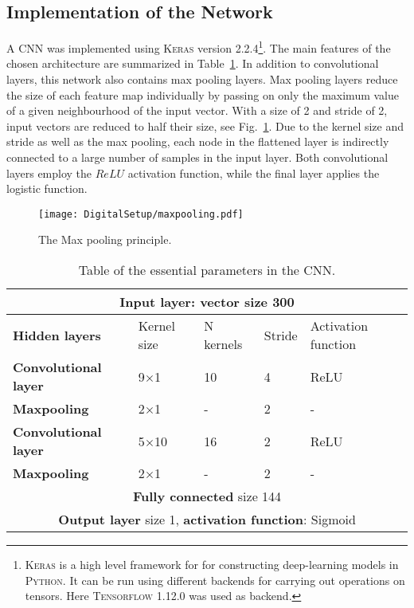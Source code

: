 \documentclass[main.tex]{subfiles}
\begin{document}
\subsection{Implementation of the Network}
A CNN was implemented using \textsc{Keras} version 2.2.4\footnote{\textsc{Keras} is a high level framework for for constructing deep-learning models in \textsc{Python}. It can be run using different backends for carrying out operations on tensors. Here \textsc{Tensorflow} 1.12.0 was used as backend.}\cite{keras}. The main features of the chosen architecture are summarized in Table~\ref{tab:architecture}. In addition to convolutional layers, this network also contains max pooling layers. Max pooling layers reduce the size of each feature map individually by passing on only the maximum value of a given neighbourhood of the input vector. With a size of 2 and stride of 2, input vectors are reduced to half their size, see Fig.~\ref{fig:maxpooking}. Due to the kernel size and stride as well as the max pooling, each node in the flattened layer is indirectly connected to a large number of samples in the input layer. Both convolutional layers employ the $ReLU$ activation function, while the final layer applies the logistic function.
\begin{figure}[ht!]
    \centering
        \texttt{[image: DigitalSetup/maxpooling.pdf]}
        \caption[The Max pooling principle]{The Max pooling principle.}
    \label{fig:maxpooking} 
\end{figure}

\begin{table}[h]
\center
\begin{tabular}{|l|l|l|l|l|}
\hline
\multicolumn{5}{|c|}{\textbf{Input layer}: vector size 300}                                            \\ \hline
\textbf{Hidden layers}       & Kernel size & N kernels & Stride & Activation function \\ \hline
\textbf{Convolutional layer} & 9$\times$1           & 10                & 4             & ReLU                \\ \hline
\textbf{Maxpooling}          & 2$\times$1           & -                 & 2             & -                   \\ \hline
\textbf{Convolutional layer} & 5$\times$10           & 16                & 2             & ReLU                \\ \hline
\textbf{Maxpooling}          & 2$\times$1           & -                 & 2             & -                   \\ \hline
\multicolumn{5}{|c|}{\textbf{Fully connected} size 144}
\\ \hline
\multicolumn{5}{|c|}{\textbf{Output layer} size 1, \textbf{activation function}: Sigmoid}               \\ \hline
\end{tabular}
\caption{Table of the essential parameters in the CNN.}
\label{tab:architecture}
\end{table}
\end{document}
